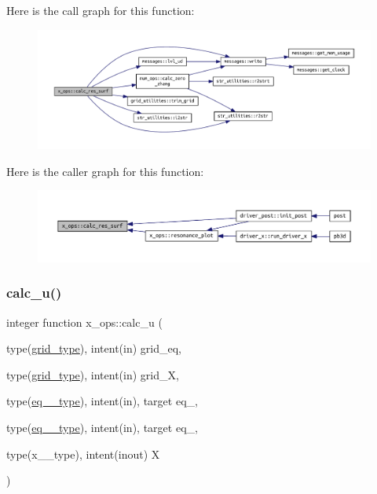 Here is the call graph for this function\+:\nopagebreak
\begin{figure}[H]
\begin{center}
\leavevmode
\includegraphics[width=350pt]{namespacex__ops_a1a90026bbbeddc25e82cfdd304df251f_cgraph}
\end{center}
\end{figure}
Here is the caller graph for this function\+:\nopagebreak
\begin{figure}[H]
\begin{center}
\leavevmode
\includegraphics[width=350pt]{namespacex__ops_a1a90026bbbeddc25e82cfdd304df251f_icgraph}
\end{center}
\end{figure}
\mbox{\label{namespacex__ops_a4e39701da15ff952add5133db1897b52}} 
\subsubsection{\texorpdfstring{calc\+\_\+u()}{calc\_u()}}
{\footnotesize\ttfamily integer function x\+\_\+ops\+::calc\+\_\+u (\begin{DoxyParamCaption}\item[{type(\hyperlink{structgrid__vars_1_1grid__type}{grid\+\_\+type}), intent(in)}]{grid\+\_\+eq,  }\item[{type(\hyperlink{structgrid__vars_1_1grid__type}{grid\+\_\+type}), intent(in)}]{grid\+\_\+X,  }\item[{type(\hyperlink{structeq__vars_1_1eq__1__type}{eq\+\_\+1\+\_\+type}), intent(in), target}]{eq\+\_,  }\item[{type(\hyperlink{structeq__vars_1_1eq__2__type}{eq\+\_\+2\+\_\+type}), intent(in), target}]{eq\+\_,  }\item[{type(x\+\_\+1\+\_\+type), intent(inout)}]{X }\end{DoxyParamCaption})}



